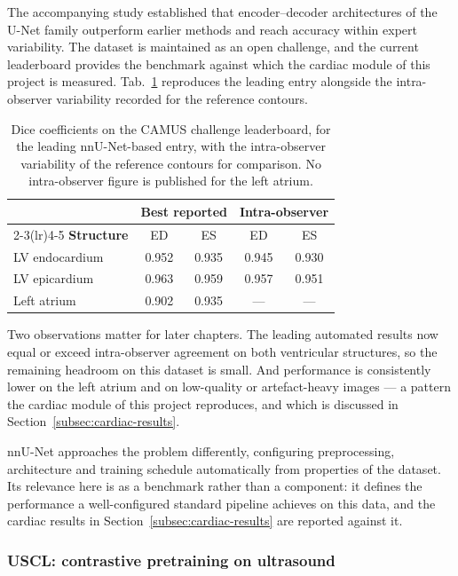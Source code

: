 The accompanying study established that encoder--decoder architectures of the U-Net family
outperform earlier methods and reach accuracy within expert variability. The dataset is
maintained as an open challenge, and the current leaderboard provides the benchmark against
which the cardiac module of this project is measured. Tab.~\ref{tab:camus} reproduces the
leading entry alongside the intra-observer variability recorded for the reference contours.

\begin{table}[H]
  \centering
  \small
  \begin{tabular}{lcccc}
    \toprule
    & \multicolumn{2}{c}{\textbf{Best reported}} &
      \multicolumn{2}{c}{\textbf{Intra-observer}} \\
    \cmidrule(lr){2-3}\cmidrule(lr){4-5}
    \textbf{Structure} & ED & ES & ED & ES \\
    \midrule
    LV endocardium & 0.952 & 0.935 & 0.945 & 0.930 \\
    LV epicardium  & 0.963 & 0.959 & 0.957 & 0.951 \\
    Left atrium    & 0.902 & 0.935 & --- & --- \\
    \bottomrule
  \end{tabular}
  \caption{Dice coefficients on the CAMUS challenge leaderboard, for the leading
    nnU-Net-based entry, with the intra-observer variability of the reference contours for
    comparison. No intra-observer figure is published for the left atrium.}
  \label{tab:camus}
\end{table}

Two observations matter for later chapters. The leading automated results now equal or
exceed intra-observer agreement on both ventricular structures, so the remaining headroom
on this dataset is small. And performance is consistently lower on the left atrium and on
low-quality or artefact-heavy images --- a pattern the cardiac module of this project
reproduces, and which is discussed in Section~\ref{subsec:cardiac-results}.

nnU-Net \cite{isensee2021nnunet} approaches the problem differently, configuring
preprocessing, architecture and training schedule automatically from properties of the
dataset. Its relevance here is as a benchmark rather than a component: it defines the
performance a well-configured standard pipeline achieves on this data, and the cardiac
results in Section~\ref{subsec:cardiac-results} are reported against it.

\subsubsection{USCL: contrastive pretraining on ultrasound}

